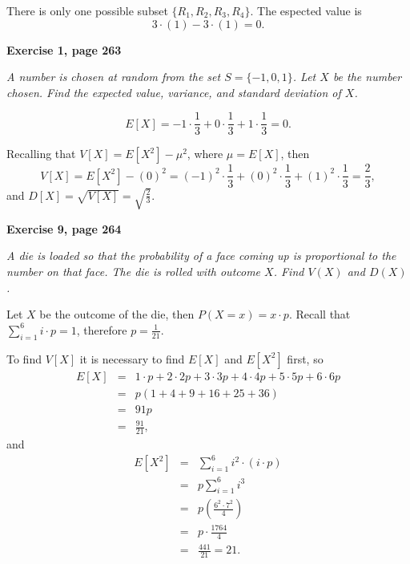 \documentclass[12pt]{article}
\begin{document}
	There is only one possible subset $\{R_1, R_2, R_3, R_4\}$. The espected value is
	\begin{equation*}
	3 \cdot (1) - 3 \cdot (1) = 0.
	\end{equation*}
	
	
	{\bf Exercise 1, page 263}
	
	{\em A number is chosen at random from the set $S = \lbrace -1, 0, 1 \rbrace$. Let $X$ be the number chosen. Find the expected value, variance, and standard deviation of $X$.}
	
	\begin{equation*}
	E[X] = -1 \cdot \frac{1}{3} + 0 \cdot \frac{1}{3} + 1 \cdot \frac{1}{3} = 0.
	\end{equation*}
	
	Recalling that $V[X] = E[X^2] - \mu^2$, where $\mu = E[X]$, then
	\begin{equation*}
	V[X] = E[X^2] - (0)^2 = (-1)^2 \cdot \frac{1}{3} + (0)^2 \cdot \frac{1}{3} + (1)^2 \cdot \frac{1}{3} = \frac{2}{3},
	\end{equation*}
	and $D[X] = \sqrt{V[X]} = \sqrt{\frac{2}{3}}$.
	
	
	{\bf Exercise 9, page 264}
	
	{\em A die is loaded so that the probability of a face coming up is proportional to the number on that face. The die is rolled with outcome $X$. Find $V(X)$ and $D(X)$.}
	
	Let $X$ be the outcome of the die, then $P(X = x) = x\cdot p$. Recall that $\displaystyle\sum_{i=1}^{6} i\cdot p = 1$, therefore $p = \frac{1}{21}$. 
	
	To find $V[X]$ it is necessary to find $E[X]$ and $E[X^2]$ first, so 
	\begin{eqnarray*}
	E[X] &=& 1 \cdot p + 2 \cdot 2p + 3 \cdot 3p + 4 \cdot 4p + 5 \cdot 5p + 6 \cdot 6p \\
	&=& p (1 + 4 + 9 + 16 + 25 + 36) \\
	&=& 91p \\
	&=& \frac{91}{21},
	\end{eqnarray*}
	and 
	\begin{eqnarray*}
	E[X^2] &=& \sum_{i=1}^{6} i^2 \cdot (i\cdot p) \\
	&=& p \sum_{i=1}^{6} i^3 \\
	&=& p \left( \frac{ 6^2 \cdot 7^2}{4} \right) \\
	&=& p \cdot \frac{1764}{4} \\
	&=& \frac{441}{21} = 21.
	\end{eqnarray*}
	
\end{document}
